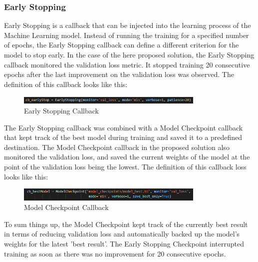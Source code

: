 \subsubsection{Early Stopping}
Early Stopping is a callback that can be injected into the learning process of the Machine Learning model. Instead of running the training for a specified number of epochs, the Early Stopping callback can define a different criterion for the model to stop early. In the case of the here proposed solution, the Early Stopping callback monitored the validation loss metric. It stopped training 20 consecutive epochs after the last improvement on the validation loss was observed. The definition of this callback looks like this:

\begin{figure}[H]
  \begin{center}
  \includegraphics[angle=0, width=0.8\textwidth]{Figures/EarlyStopping.PNG}
  \caption{Early Stopping Callback}
  \label{fig:EarlyStopping}
  \end{center}
\end{figure}

The Early Stopping callback was combined with a Model Checkpoint callback that kept track of the best model during training and saved it to a predefined destination. The Model Checkpoint callback in the proposed solution also monitored the validation loss, and saved the current weights of the model at the point of the validation loss being the lowest. The definition of this callback loss looks like this:

\begin{figure}[H]
  \begin{center}
  \includegraphics[angle=0, width=0.8\textwidth]{Figures/ModelCheckpoint.PNG}
  \caption{Model Checkpoint Callback}
  \label{fig:ModelCheckpoint}
  \end{center}
\end{figure}

To sum things up, the Model Checkpoint kept track of the currently best result in terms of reducing validation loss and automatically backed up the model's weights for the latest 'best result'. The Early Stopping Checkpoint interrupted training as soon as there was no improvement for 20 consecutive epochs.

